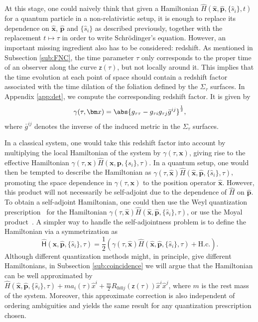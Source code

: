 \documentclass[letterpaper,12pt,titlepage,oneside,final]{book}
\newcommand{\mf}{\mathsf}%
\begin{document}
At this stage, one could naively think that given a Hamiltonian $\hat{H}(\hat{\bm x},\hat{\bm p},\{\hat{s}_i\},t)$ for a quantum particle in a non-relativistic setup, it is enough to replace its dependence on $\hat{\bm x}$, $\hat{\bm p}$ and $\{\hat{s}_i\}$ as described previously, together with the replacement $t\longmapsto\tau$ in order to write Schr\"odinger's equation. However, an important missing ingredient also has to be considered: redshift. As mentioned in Subsection \ref{sub:FNC}, the time parameter $\tau$ only corresponds to the proper time of an observer along the curve $\mf z(\tau)$, but not locally around it. This implies that the time evolution at each point of space should contain a redshift factor associated with the time dilation of the foliation defined by the $\Sigma_\tau$ surfaces. In Appendix \ref{app:det}, we compute the corresponding redshift factor. It is given by
\begin{equation}\label{eq:redshift}
    \gamma(\tau,\bm x) = \abs{g_{\tau\tau} - g_{\tau i} g_{\tau j} \bar{g}^{ij}}^{\frac{1}{2}},
\end{equation}
where $\bar{g}^{ij}$ denotes the inverse of the induced metric in the $\Sigma_\tau$ surfaces. 

In a classical system, one would take this redshift factor into account by multiplying the local Hamiltonian of the system by $\gamma(\tau,{\bm x})$, giving rise to the effective Hamiltonian $\gamma(\tau,{\bm x})\hat{H}({\bm x},{\bm p},\{{s}_i\},\tau)$. In a quantum setup, one would then be tempted to describe the Hamiltonian as $\gamma(\tau,\hat{\bm x})\hat{H}(\hat{\bm x},\hat{\bm p},\{\hat{s}_i\},\tau)$, promoting the space dependence in $\gamma(\tau,\bm x)$ to the position operator $\hat{\bm x}$. However, this product will not necessarily be self-adjoint due to the dependence of $\hat{H}$ on $\hat{\bm p}$. To obtain a self-adjoint Hamiltonian, one could then use the Weyl quantization prescription~\cite{Weyl1927} for the Hamiltonian $\gamma(\tau,\hat{\bm x})\hat{H}(\hat{\bm x},\hat{\bm p},\{\hat{s}_i\},\tau)$, or use the Moyal product~\cite{moyal}. A simpler way to handle the self-adjointness problem is to define the Hamiltonian via a symmetrization as
\begin{equation}\label{eq:Hcurved}
    \hat{\mathsf{H}}(\hat{\bm x},\hat{\bm p},\{\hat{s}_i\},\tau) = \frac{1}{2}\left(\gamma(\tau,\hat{\bm x})\hat{H}(\hat{\bm x},\hat{\bm p},\{\hat{s}_i\},\tau) + \text{H.c.}\right).
\end{equation}
Although different quantization methods might, in principle, give different Hamiltonians, in Subsection \ref{sub:coincidence} we will argue that the Hamiltonian can be well approximated by \mbox{$\hat{H}(\hat{\bm x},\hat{\bm p},\{\hat{s}_i\},\tau)+ma_i(\tau)\hat{x}^i + \frac{m}{2}R_{0i0j}(\mf z(\tau))\hat{x}^i\hat{x}^j$}, where $m$ is the rest mass of the system. Moreover, this approximate correction is also independent of ordering ambiguities and yields the same result for any quantization prescription chosen. %
\end{document}
